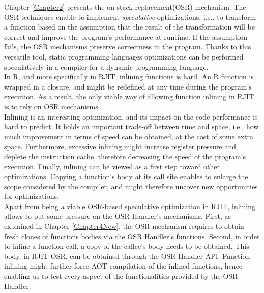 Chapter \ref{Chapter2} presents the on-stack replacement(OSR) mechanism.
The OSR techniques enable to implement \textit{speculative} optimizations, i.e., to transform a function based on the assumption that the result of the transformation will be correct and improve the program's performance at runtime.
If the assumption fails, the OSR mechanisms preserve correctness in the program.
Thanks to this versatile tool, static programming languages optimizations can be performed speculatively in a compiler for a dynamic programming language.\\

In R, and more specifically in RJIT, inlining functions is hard. 
An R function is wrapped in a closure, and might be redefined at any time during the program's execution.
As a result, the only viable way of allowing function inlining in RJIT is to rely on OSR mechanisms.\\

Inlining is an interesting optimization, and its impact on the code performance is hard to predict. 
It holds an important trade-off between time and space, i.e., how much improvement in terms of speed can be obtained, at the cost of some extra space.
Furthermore, excessive inlining might increase register pressure and deplete the instruction cache, therefore decreasing the speed of the program's execution.
Finally, inlining can be viewed as a first step toward other optimizations.
Copying a function's body at its call site enables to enlarge the scope considered by the compiler, and might therefore uncover new opportunities for optimizations.\\

Apart from being a viable OSR-based speculative optimization in RJIT, inlining allows to put some pressure on the OSR Handler's mechanisms.
First, as explained in Chapter \ref{Chapter4New}, the OSR mechanism requires to obtain fresh clones of functions bodies via the OSR Handler's functions.
Second, in order to inline a function call, a copy of the callee's body needs to be obtained.
This body, in RJIT OSR, can be obtained through the OSR Handler API.
Function inlining might further force AOT compilation of the inlined functions, hence enabling us to test every aspect of the functionalities provided by the OSR Handler.\\


